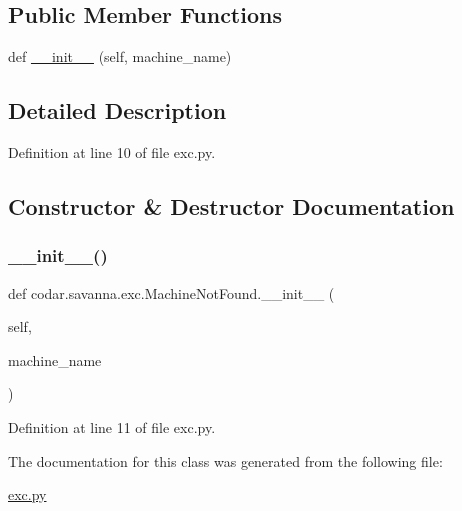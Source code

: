 \subsection*{Public Member Functions}
\begin{DoxyCompactItemize}
\item 
def \hyperlink{classcodar_1_1savanna_1_1exc_1_1_machine_not_found_aac59d9a2636166df83d3260fb7bc8933}{\+\_\+\+\_\+init\+\_\+\+\_\+} (self, machine\+\_\+name)
\end{DoxyCompactItemize}


\subsection{Detailed Description}


Definition at line 10 of file exc.\+py.



\subsection{Constructor \& Destructor Documentation}
\mbox{\label{classcodar_1_1savanna_1_1exc_1_1_machine_not_found_aac59d9a2636166df83d3260fb7bc8933}} 
\subsubsection{\texorpdfstring{\+\_\+\+\_\+init\+\_\+\+\_\+()}{\_\_init\_\_()}}
{\footnotesize\ttfamily def codar.\+savanna.\+exc.\+Machine\+Not\+Found.\+\_\+\+\_\+init\+\_\+\+\_\+ (\begin{DoxyParamCaption}\item[{}]{self,  }\item[{}]{machine\+\_\+name }\end{DoxyParamCaption})}



Definition at line 11 of file exc.\+py.



The documentation for this class was generated from the following file\+:\begin{DoxyCompactItemize}
\item 
\hyperlink{exc_8py}{exc.\+py}\end{DoxyCompactItemize}
